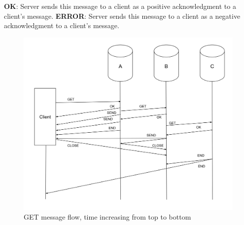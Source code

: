 \documentclass[preprint,10pt]{elsarticle}
\newcommand{\fscale}[1]{#1\linewidth}
\theoremstyle{definition}
\begin{document}
\newline
\newline
\textbf{OK}: Server sends this message to a client as a positive acknowledgment to a client's message.
\newline
\newline
\textbf{ERROR}: Server sends this message to a client as a negative acknowledgment to a client's message.
\begin{figure}[h!] \centering
	\includegraphics[width=\fscale{0.76}]{mx1.png}
	\caption{\textsf{GET} message flow, time increasing from top to bottom}
	\label{fig:mx}
\end{figure}

\end{document}
